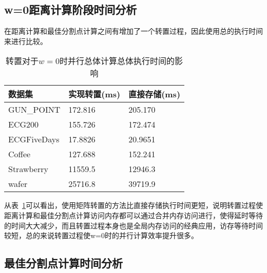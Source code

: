 \subsection{w=0距离计算阶段时间分析}

在距离计算和最佳分割点计算之间有增加了一个转置过程，因此使用总的执行时间来进行比较。

\begin{table}[htbp]
	\centering
	\begin{minipage}{0.72\textwidth}
		\caption{转置对于$w=0$时并行总体计算总体执行时间的影响}
		\label{tab:transpose}
		\begin{tabular}{p{3cm}p{3cm}p{3cm}}
			\toprule[1.5pt]
			{\heiti 数据集 } &{\heiti 实现转置(ms) } &{\heiti 直接存储(ms) }
			\\\midrule[1pt]							
			GUN\_POINT & 172.816 & 205.170 \\
			ECG200 & 155.726 & 172.474\\
			ECGFiveDays & 17.8826 & 20.9651\\
			Coffee & 127.688 & 152.241\\
			Strawberry & 11559.5 & 12946.3\\
			wafer & 25716.8 & 39719.9 \\
			\bottomrule[1.5pt]
		\end{tabular}
	\end{minipage}
\end{table}

从表~\ref{tab:transpose}可以看出，使用矩阵转置的方法比直接存储执行时间更短，说明转置过程使距离计算和最佳分割点计算访问内存都可以通过合并内存访问进行，使得延时等待的时间大大减少，而且转置过程本身也是全局内存访问的经典应用，访存等待时间较短，总的来说转置过程使w=0时的并行计算效率提升很多。

\subsection{最佳分割点计算时间分析}

